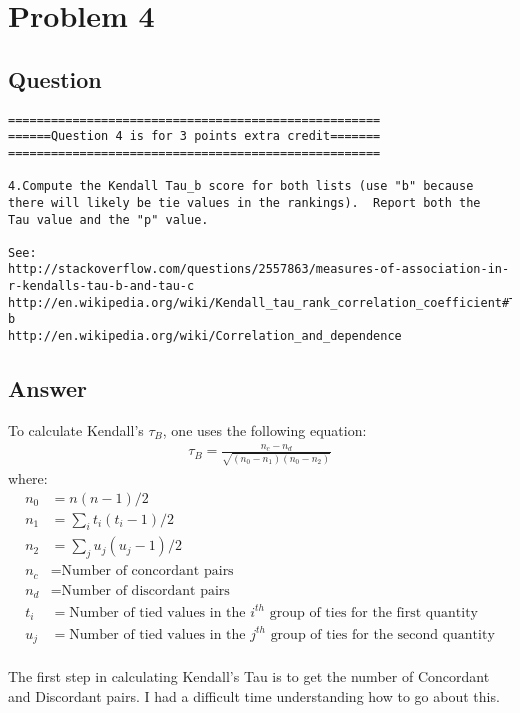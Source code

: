 \section{Problem 4}
\label{part4}
\subsection*{Question}
\begingroup

\begin{verbatim}
====================================================
======Question 4 is for 3 points extra credit=======
====================================================

4.Compute the Kendall Tau_b score for both lists (use "b" because
there will likely be tie values in the rankings).  Report both the
Tau value and the "p" value.

See: 
http://stackoverflow.com/questions/2557863/measures-of-association-in-r-kendalls-tau-b-and-tau-c
http://en.wikipedia.org/wiki/Kendall_tau_rank_correlation_coefficient#Tau-b
http://en.wikipedia.org/wiki/Correlation_and_dependence

\end{verbatim}
\endgroup
\newpage

\subsection*{Answer}

To calculate Kendall's $\tau_B$, one uses the following equation\cite{ktaubwikipedia}:
\begin{align*}
\tau_B = \frac{n_c - n_d}{\sqrt{(n_0 - n_1)(n_0 - n_2)}}
\end{align*}
where:
\begin{align*}
n_0 & = n(n-1)/2 \\
n_1 & = \sum_i t_i (t_i - 1)/2 \\
n_2 & = \sum_j u_j (u_j - 1)/2 \\
n_c & = \textrm{Number of concordant pairs} \\
n_d & = \textrm{Number of discordant pairs} \\
t_i & = \textrm{Number of tied values in the $i^{th}$ group of ties for the first quantity} \\
u_j & = \textrm{Number of tied values in the $j^{th}$ group of ties for the second quantity} \\
\end{align*}

The first step in calculating Kendall's Tau is to get the number of Concordant and Discordant pairs.  I had a difficult time understanding how to go about this.

